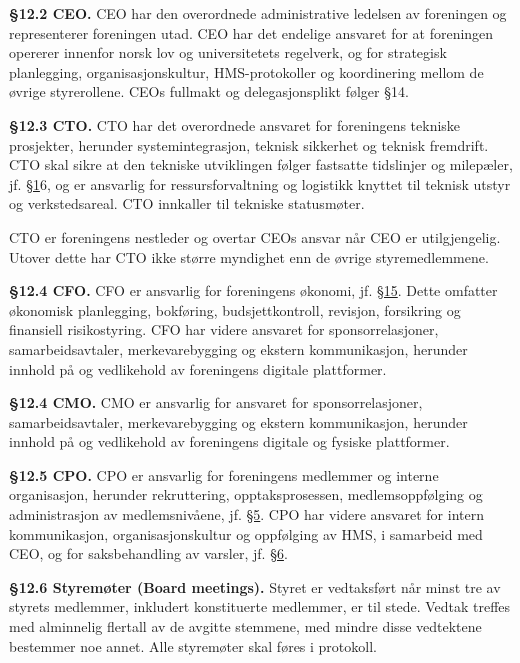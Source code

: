 \documentclass{../../../Common/Latex/Templates/rapport}
\begin{document}
\textbf{\S 12.2 CEO.}\label{bylaw:12.2} CEO har den overordnede administrative ledelsen av foreningen og representerer foreningen utad. CEO har det endelige ansvaret for at foreningen opererer innenfor norsk lov og universitetets regelverk, og for strategisk planlegging, organisasjonskultur, HMS-protokoller og koordinering mellom de øvrige styrerollene. CEOs fullmakt og delegasjonsplikt følger \S14.

\textbf{\S 12.3 CTO.}\label{bylaw:12.3} CTO har det overordnede ansvaret for foreningens tekniske prosjekter, herunder systemintegrasjon, teknisk sikkerhet og teknisk fremdrift. CTO skal sikre at den tekniske utviklingen følger fastsatte tidslinjer og milepæler, jf. \hyperref[bylaw:1]{\S 1}6, og er ansvarlig for ressursforvaltning og logistikk knyttet til teknisk utstyr og verkstedsareal. CTO innkaller til tekniske statusmøter.

CTO er foreningens nestleder og overtar CEOs ansvar når CEO er utilgjengelig. Utover dette har CTO ikke større myndighet enn de øvrige styremedlemmene.

\textbf{\S 12.4 CFO.}\label{bylaw:12.4-cfo} CFO er ansvarlig for foreningens økonomi, jf. \hyperref[bylaw:15]{\S 15}. Dette omfatter økonomisk planlegging, bokføring, budsjettkontroll, revisjon, forsikring og finansiell risikostyring. CFO har videre ansvaret for sponsorrelasjoner, samarbeidsavtaler, merkevarebygging og ekstern kommunikasjon, herunder innhold på og vedlikehold av foreningens digitale plattformer.

\textbf{\S 12.4 CMO.}\label{bylaw:12.4-cmo} CMO er ansvarlig for ansvaret for sponsorrelasjoner, samarbeidsavtaler, merkevarebygging og ekstern kommunikasjon, herunder innhold på og vedlikehold av foreningens digitale og fysiske plattformer.

\textbf{\S 12.5 CPO.}\label{bylaw:12.5} CPO er ansvarlig for foreningens medlemmer og interne organisasjon, herunder rekruttering, opptaksprosessen, medlemsoppfølging og administrasjon av medlemsnivåene, jf. \hyperref[bylaw:5]{\S 5}. CPO har videre ansvaret for intern kommunikasjon, organisasjonskultur og oppfølging av HMS, i samarbeid med CEO, og for saksbehandling av varsler, jf. \hyperref[bylaw:6]{\S 6}.

\textbf{\S 12.6 Styremøter (Board meetings).}\label{bylaw:12.6} Styret er vedtaksført når minst tre av styrets medlemmer, inkludert konstituerte medlemmer, er til stede. Vedtak treffes med alminnelig flertall av de avgitte stemmene, med mindre disse vedtektene bestemmer noe annet. Alle styremøter skal føres i protokoll.
\end{document}
